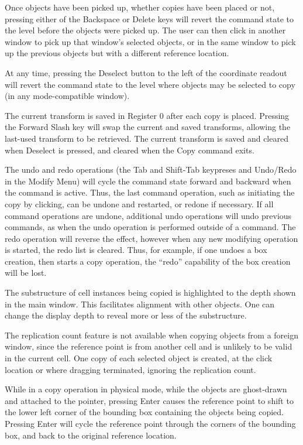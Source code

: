 Once objects have been picked up, whether copies have been placed or
not, pressing either of the {\kb Backspace} or {\kb Delete} keys will
revert the command state to the level before the objects were picked
up.  The user can then click in another window to pick up that
window's selected objects, or in the same window to pick up the
previous objects but with a different reference location.

At any time, pressing the {\cb Deselect} button to the left of the
coordinate readout will revert the command state to the level where
objects may be selected to copy (in any mode-compatible window).

The current transform is saved in Register 0 after each copy is placed.
Pressing the {\cb Forward Slash} key will swap the current and saved
transforms, allowing the last-used transform to be retrieved.  The
current transform is saved and cleared when {\cb Deselect} is pressed,
and cleared when the {\cb Copy} command exits.

The undo and redo operations (the {\kb Tab} and {\kb Shift-Tab}
keypreses and {\cb Undo}/{\cb Redo} in the {\cb Modify Menu}) will
cycle the command state forward and backward when the command is
active.  Thus, the last command operation, such as initiating the
copy by clicking, can be undone and restarted, or redone if
necessary.  If all command operations are undone, additional undo
operations will undo previous commands, as when the undo operation is
performed outside of a command.  The redo operation will reverse the
effect, however when any new modifying operation is started, the redo
list is cleared.  Thus, for example, if one undoes a box creation,
then starts a copy operation, the ``redo'' capability of the box
creation will be lost.

The substructure of cell instances being copied is highlighted to the
depth shown in the main window.  This facilitates alignment with other
objects.  One can change the display depth to reveal more or less of
the substructure.

The replication count feature is not available when copying objects
from a foreign window, since the reference point is from another cell
and is unlikely to be valid in the current cell.  One copy of each
selected object is created, at the click location or where dragging
terminated, ignoring the replication count.

While in a copy operation in physical mode, while the objects are
ghost-drawn and attached to the pointer, pressing {\kb Enter} causes
the reference point to shift to the lower left corner of the bounding
box containing the objects being copied.  Pressing {\kb Enter} will
cycle the reference point through the corners of the bounding box, and
back to the original reference location.

